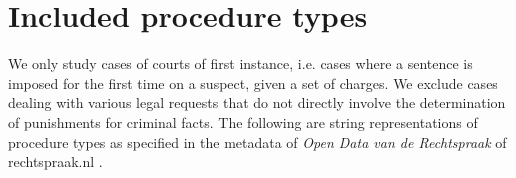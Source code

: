 \documentclass[a4paper]{article}
\begin{document}
\begin{comment}
LOGICA:

"Veroordeelt verdachte tot een gevangenisstraf voor de duur van 12 (twaalf) maanden. Beveelt dat de tijd die door veroordeelde voor de tenuitvoerlegging van deze uitspraak in verzekering en in voorlopige hechtenis is doorgebracht, bij de tenuitvoerlegging van die straf in mindering gebracht zal worden. Beveelt dat een gedeelte, groot 3 (drie) maanden, van deze gevangenisstraf niet tenuitvoergelegd zal worden, tenzij later anders wordt gelast." (ECLI:NL:RBAMS:2020:5945)

Test hypothese: als er voorwaardeijk wordt gematched, dan willen we num 2 niet meetellen
gevangenisstraf van 2 weken voorwaardelijk met een proeftijd van 2 jaar

``gevangenisstraf van 12 (twaalf) maanden, waarvan  6 (zes) maanden voorwaardelijk met een proeftijd''

Problematische frase e.g. in ECLI:NL:RBZWB:2020:6800: "- spreekt verdachte vrij van wat meer of anders is ten laste gelegd;".
Dit is gelabeled als vrijspraak, maar er wordt een plaatsing in inrichting toegekend van 2 jaar. 

Ik lees hier een zaak van iemand die een T-shirt heeft gestolen. In de beslissing staat dan:
"
- verklaart het ten laste gelegde bewezen, zodanig als hierboven onder 4.4 is omschreven;
- spreekt verdachte vrij van wat meer of anders is ten laste gelegd;
"

De tenlastelegging is alleen m.b.t. het t-shirt. Dus het vreemde is hier eigenlijk dat er hier een "vrijspraak" wordt aangeduidt van feiten die helemaal niet in de zaak worden benoemd. Wat betreft de tenlastelegging wordt de verdachte gewoon schuldig bevonden en 2 jaar in een inrichting geplaatst, dus het is niet bepaald "vrijspraak".

Is deze "vrijspraak" een formaliteit om bijv. basically te zeggen: verdachte wordt gestraft voor dit feit en daarmee is de kous af, ofzo? Waarom is die extra formulering nodig?

Deze proeftijd wordt niet opgepikt!

'''
 - veroordeelt verdachte tot een gevangenisstraf van 2 weken voorwaardelijk met een proeftijd van 2 jaar;
'''
\end{comment}


\section{Included procedure types}

We only study cases of courts of first instance, i.e. cases where a sentence is imposed for the first time on a suspect, given a set of charges.
We exclude cases dealing with various legal requests that do not directly involve the determination of punishments for criminal facts.
The following are string representations of procedure types as specified in the metadata of \emph{Open Data van de Rechtspraak} of rechtspraak.nl .
\end{document}
